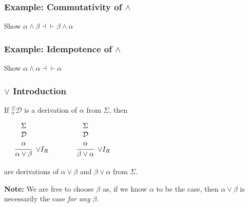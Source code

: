 \documentclass{beamer}
\theoremstyle{indentDefn} \newtheorem{defn}[]{Definition}
\begin{document}
\begin{frame}
	\frametitle{Example: Commutativity of $\land$}
	
	Show $\alpha \land \beta \dashv\vdash \beta \land \alpha$
		
	\vspace{7cm}
	
\end{frame}

\begin{frame}
	\frametitle{Example: Idempotence of $\land$}
	
	Show $\alpha \land \alpha \dashv\vdash \alpha$
	
	\vspace{7cm}
	
\end{frame}


\begin{frame}
	\frametitle{$\lor$ Introduction}
	
	If $^{\Sigma}_{\alpha}\mathcal{D}$ is a derivation of $\alpha$ from $\Sigma$, then 
	
	\begin{center}
		
	$\begin{array}{ c c c }	
		\begin{array}{ c c }		
			\begin{array}{c}		
				\infer[\lor I_{R}]{\alpha \lor \beta}
				{\begin{array}{c} \Sigma \\ \mathcal{D} \\ \alpha \end{array}}
			\end{array}
		\end{array}
		
		&
		
		&
		
		\begin{array}{ c c }		
			\begin{array}{c}		
				\infer[\lor I_{R}]{\beta \lor \alpha}
				{\begin{array}{c} \Sigma \\ \mathcal{D} \\ \alpha \end{array}}
			\end{array}
		\end{array}		
		
		
	\end{array}$
	\end{center}
	
	are derivations of $\alpha \lor \beta$ and $\beta \lor \alpha$ from $\Sigma$. 
	
	\vspace{1cm}
	
	{\bf Note:} We are free to choose $\beta$ as, if we know $\alpha$ to be the case, then $\alpha \lor \beta$  is necessarily the case \emph{for any }$\beta$. 
	
\end{frame}
\end{document}
